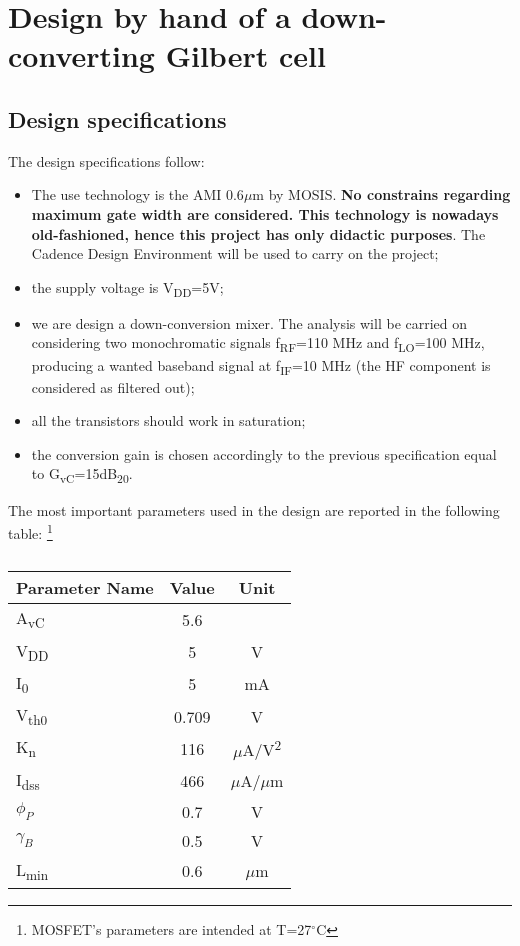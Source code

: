 \section{Design by hand of a down-converting Gilbert cell}

\subsection{Design specifications}
The design specifications follow:
\begin{itemize}
	\item The use technology is the AMI 0.6$\mu$m by MOSIS. \textbf{No constrains regarding maximum gate width are considered. This technology is nowadays  old-fashioned, hence this project has only didactic purposes}. The Cadence Design Environment will be used to carry on the project;
	\item the supply voltage is V\textsubscript{DD}=5V;
	\item we are design a down-conversion mixer. The analysis will be carried on considering two monochromatic signals f\textsubscript{RF}=110 MHz and f\textsubscript{LO}=100 MHz, producing a wanted baseband signal at f\textsubscript{IF}=10 MHz (the HF component is considered as filtered out);
	\item all the transistors should work in saturation;
	\item the conversion gain is chosen accordingly to the previous specification equal to G\textsubscript{vC}=15dB\textsubscript{20}.
\end{itemize}
The most important parameters used in the design are reported in the following table: \footnote{MOSFET's parameters are intended at T=27$^\circ$C}
\begin{table} [h]
	\label{tab:specs}
	\caption{}
	\centering	
	\begin{tabular}{lcc} 
		\toprule 
		Parameter Name			& Value 	& Unit \\ 
		\midrule
		A\textsubscript{vC} & 5.6 & \\
		V\textsubscript{DD}		&	5 & V		\\
		I\textsubscript{0} & 5 & mA \\
		V\textsubscript{th0}			& 0.709 &V		\\ 
		K\textsubscript{n} & 116 & $\mu$A/V\textsuperscript{2}\\
		I\textsubscript{dss}	& 466 & $\mu$A/$\mu$m \\
		$\phi_P$ & 0.7 & V \\
		$\gamma_B$ & 0.5 & V \\
		L\textsubscript{min} & 0.6 & $\mu$m \\
		\bottomrule 
	\end{tabular}	
\end{table}

